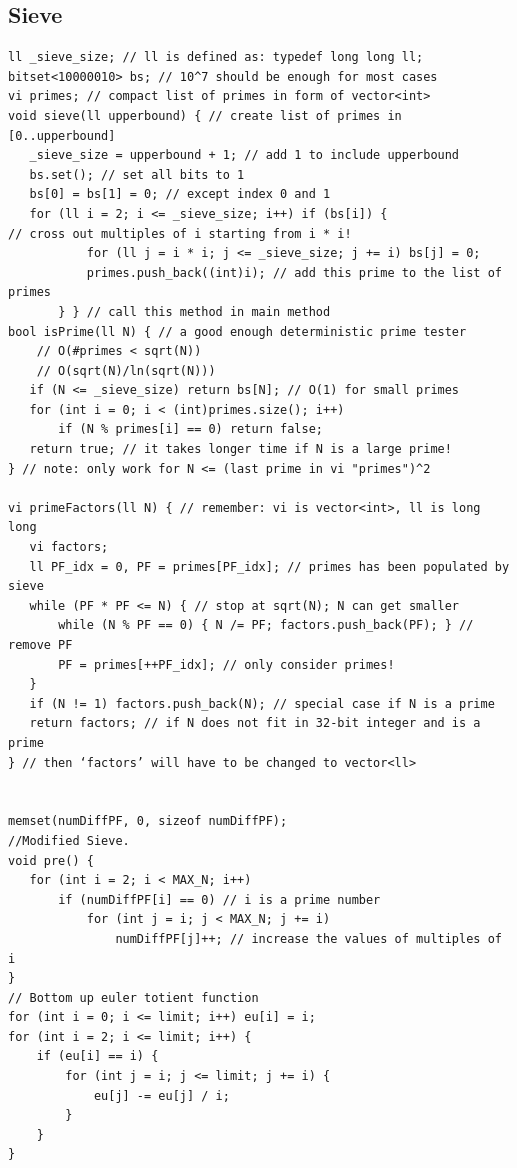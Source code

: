 \documentclass[8pt, a4paper, oneside, twocolumn]{extarticle}
\begin{document}
\subsection{Sieve}
\begin{verbatim}
ll _sieve_size; // ll is defined as: typedef long long ll;
bitset<10000010> bs; // 10^7 should be enough for most cases
vi primes; // compact list of primes in form of vector<int>
void sieve(ll upperbound) { // create list of primes in [0..upperbound]
   _sieve_size = upperbound + 1; // add 1 to include upperbound
   bs.set(); // set all bits to 1
   bs[0] = bs[1] = 0; // except index 0 and 1
   for (ll i = 2; i <= _sieve_size; i++) if (bs[i]) {
// cross out multiples of i starting from i * i!
           for (ll j = i * i; j <= _sieve_size; j += i) bs[j] = 0;
           primes.push_back((int)i); // add this prime to the list of primes
       } } // call this method in main method
bool isPrime(ll N) { // a good enough deterministic prime tester
    // O(#primes < sqrt(N))
    // O(sqrt(N)/ln(sqrt(N)))
   if (N <= _sieve_size) return bs[N]; // O(1) for small primes
   for (int i = 0; i < (int)primes.size(); i++)
       if (N % primes[i] == 0) return false;
   return true; // it takes longer time if N is a large prime!
} // note: only work for N <= (last prime in vi "primes")^2

vi primeFactors(ll N) { // remember: vi is vector<int>, ll is long long
   vi factors;
   ll PF_idx = 0, PF = primes[PF_idx]; // primes has been populated by sieve
   while (PF * PF <= N) { // stop at sqrt(N); N can get smaller
       while (N % PF == 0) { N /= PF; factors.push_back(PF); } // remove PF
       PF = primes[++PF_idx]; // only consider primes!
   }
   if (N != 1) factors.push_back(N); // special case if N is a prime
   return factors; // if N does not fit in 32-bit integer and is a prime
} // then ‘factors’ will have to be changed to vector<ll>


memset(numDiffPF, 0, sizeof numDiffPF);
//Modified Sieve.
void pre() {
   for (int i = 2; i < MAX_N; i++)
       if (numDiffPF[i] == 0) // i is a prime number
           for (int j = i; j < MAX_N; j += i)
               numDiffPF[j]++; // increase the values of multiples of i
}
// Bottom up euler totient function
for (int i = 0; i <= limit; i++) eu[i] = i;
for (int i = 2; i <= limit; i++) {
    if (eu[i] == i) {
        for (int j = i; j <= limit; j += i) {
            eu[j] -= eu[j] / i;
        }
    }
}
\end{verbatim}
\end{document}
